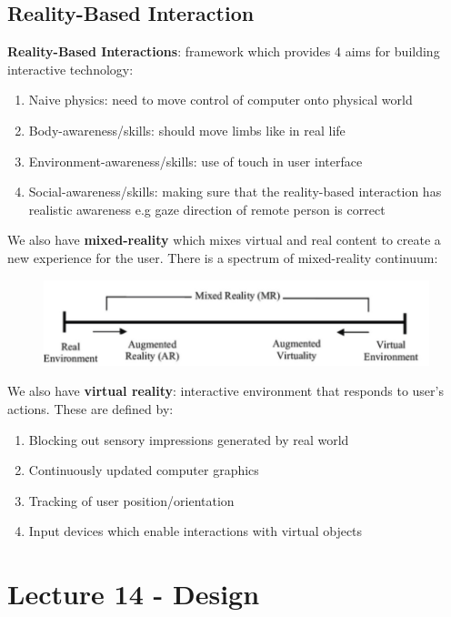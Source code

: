\documentclass{article}
\begin{document}
\subsection{Reality-Based Interaction}
\textbf{Reality-Based Interactions}: framework which provides 4 aims for building interactive technology:
\begin{enumerate}
    \item Naive physics: need to move control of computer onto physical world
    \item Body-awareness/skills: should move limbs like in real life
    \item Environment-awareness/skills: use of touch in user interface
    \item Social-awareness/skills: making sure that the reality-based interaction has realistic awareness e.g gaze direction of remote person is correct
\end{enumerate}
We also have \textbf{mixed-reality} which mixes virtual and real content to create a new experience for the user. There is a spectrum of mixed-reality continuum:
\begin{figure}[H]
    \centering
    \includegraphics[width=0.5\linewidth]{Pictures/Screenshot 2023-03-04 at 19.07.43.png}
\end{figure}
We also have \textbf{virtual reality}: interactive environment that responds to user's actions. These are defined by:
\begin{enumerate}
    \item Blocking out sensory impressions generated by real world
    \item Continuously updated computer graphics
    \item Tracking of user position/orientation
    \item Input devices which enable interactions with virtual objects
\end{enumerate}
\section{Lecture 14 - Design}
\end{document}
